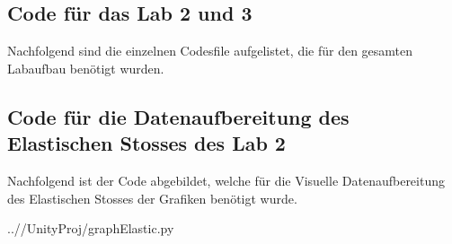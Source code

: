 \documentclass[../main.tex]{subfiles}
\begin{document}
    \subsection{Code für das Lab 2 und 3}
    Nachfolgend sind die einzelnen Codesfile aufgelistet, die für den gesamten Labaufbau benötigt wurden.

    
    \begin{lstinputlisting}[label={lst:CubeController}]
        {\cubeControllerFile}
    \end{lstinputlisting}

    
    \begin{lstinputlisting}[label={lst:CubeController}]
    {\lineJuliaFile}
    \end{lstinputlisting}


    
    \begin{lstinputlisting}[label={lst:CubeController}]
    {\ropeSpawnFile}
    \end{lstinputlisting}


    
    \begin{lstinputlisting}[label={lst:CubeController}]
    {\swingJuliaFile}
    \end{lstinputlisting}


    
    \begin{lstinputlisting}[label={lst:CubeController}]
    {\ropeSpawnFile}
    \end{lstinputlisting}


    
    \begin{lstinputlisting}[label={lst:CubeController}]
    {\swingRomeoFile}
    \end{lstinputlisting}


    \subsection{Code für die Datenaufbereitung des Elastischen Stosses des Lab 2}
    Nachfolgend ist der Code abgebildet, welche für die Visuelle Datenaufbereitung des Elastischen Stosses
    der Grafiken benötigt wurde.
    \begin{lstinputlisting}[label={lst:Elastischen}]
    {..//UnityProj/graphElastic.py}
    \end{lstinputlisting}
\end{document}
